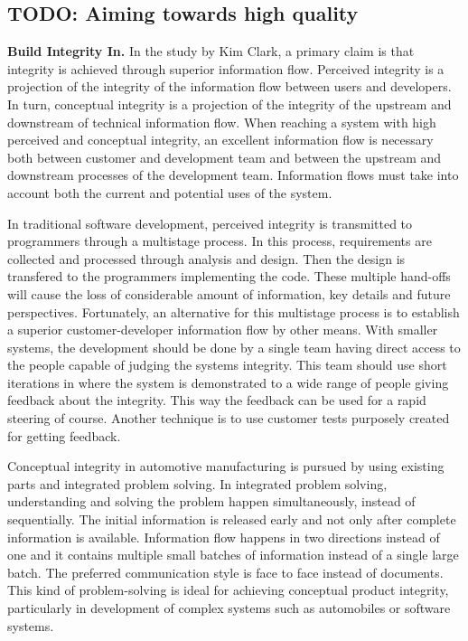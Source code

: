 \subsection{TODO: Aiming towards high quality}

\textbf{Build Integrity In.} In the study by Kim Clark, a primary claim is that integrity is achieved through superior information flow. Perceived integrity is a projection of the integrity of the information flow between users and developers. In turn, conceptual integrity is a projection of the integrity of the upstream and downstream of technical information flow. When reaching a system with high perceived and conceptual integrity, an excellent information flow is necessary both between customer and development team and between the upstream and downstream processes of the development team. Information flows must take into account both the current and potential uses of the system.

In traditional software development, perceived integrity is transmitted to programmers through a multistage process. In this process, requirements are collected and processed through analysis and design. Then the design is transfered to the programmers implementing the code. These multiple hand-offs will cause the loss of considerable amount of information, key details and future perspectives. Fortunately, an alternative for this multistage process is to establish a superior customer-developer information flow by other means. With smaller systems, the development should be done by a single team having direct access to the people capable of judging the systems integrity. This team should use short iterations in where the system is demonstrated to a wide range of people giving feedback about the integrity. This way the feedback can be used for a rapid steering of course. Another technique is to use customer tests purposely created for getting feedback.

Conceptual integrity in automotive manufacturing is pursued by using existing parts and integrated problem solving. In integrated problem solving, understanding and solving the problem happen simultaneously, instead of sequentially. The initial information is released early and not only after complete information is available. Information flow happens in two directions instead of one and it contains multiple small batches of information instead of a single large batch. The preferred communication style is face to face instead of documents. This kind of problem-solving is ideal for achieving conceptual product integrity, particularly in development of complex systems such as automobiles or software systems.

